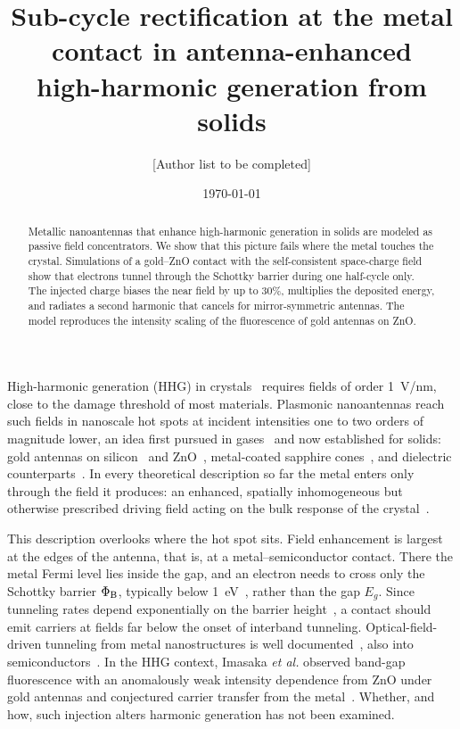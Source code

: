 \documentclass[aps,prl,twocolumn,superscriptaddress,floatfix,nolongbibliography]{revtex4-2}
\newcommand{\PhiB}{\Phi_{\rm B}}
\newcommand{\Eg}{E_g}
\begin{document}
\title{Sub-cycle rectification at the metal contact in antenna-enhanced\\ high-harmonic generation from solids}

\author{[Author list to be completed]}

\date{\today}

\begin{abstract}
Metallic nanoantennas that enhance high-harmonic generation in solids are modeled as passive
field concentrators. We show that this picture fails where the metal touches the crystal.
Simulations of a gold--ZnO contact with the self-consistent space-charge field show that
electrons tunnel through the Schottky barrier during one half-cycle only. The injected charge
biases the near field by up to 30\%, multiplies the deposited energy, and
radiates a second harmonic that cancels for mirror-symmetric antennas. The model reproduces
the intensity scaling of the fluorescence of gold antennas on ZnO.
\end{abstract}

\maketitle

High-harmonic generation (HHG) in crystals~\cite{ghimire2011,ghimire2019,vampa2014} requires
fields of order 1~V/nm, close to the damage threshold of most materials. Plasmonic nanoantennas
reach such fields in nanoscale hot spots at incident intensities one to two orders of magnitude
lower, an idea first pursued in gases~\cite{kim2008,sivis2013} and now established for
solids: gold antennas on silicon~\cite{vampa2017,jalil2023} and
ZnO~\cite{imasaka2018}, metal-coated sapphire cones~\cite{han2016}, and dielectric
counterparts~\cite{sivis2017,liu2018,tonkaev2026}. In every theoretical
description so far the metal enters only through the field it produces: an enhanced, spatially
inhomogeneous but otherwise prescribed driving field acting on the bulk
response of the crystal~\cite{ciappina2012,husakou2011,rudenko2022}.

This description overlooks where the hot spot sits. Field enhancement is largest at the edges of
the antenna, that is, at a metal--semiconductor contact. There the metal Fermi level lies inside
the gap, and an electron needs to cross only the Schottky barrier $\PhiB$, typically below
1~eV~\cite{tersoff1984}, rather than the gap $\Eg$. Since tunneling rates depend
exponentially on the barrier height~\cite{fowler1928,keldysh1965}, a contact should emit
carriers at fields far below the onset of interband tunneling. Optical-field-driven tunneling from metal nanostructures is well
documented~\cite{kruger2011,rybka2016,putnam2017}, also into
semiconductors~\cite{heide2020,li2023}. In the HHG
context, Imasaka \textit{et al.} observed band-gap fluorescence with an anomalously weak intensity
dependence from ZnO under gold antennas and conjectured carrier transfer from the
metal~\cite{imasaka2018}. Whether, and how, such injection alters harmonic generation has
not been examined.
\end{document}
